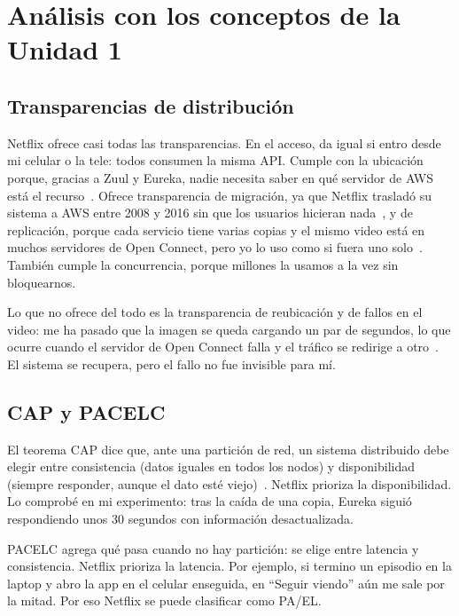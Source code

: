 \section{Análisis con los conceptos de la Unidad 1}

\subsection{Transparencias de distribución}

Netflix ofrece casi todas las transparencias. En el acceso, da igual si entro desde mi celular o la tele: todos consumen la misma API. Cumple con la ubicación porque, gracias a Zuul y Eureka, nadie necesita saber en qué servidor de AWS está el recurso~\cite{SpringCloudNetflix}. Ofrece transparencia de migración, ya que Netflix trasladó su sistema a AWS entre 2008 y 2016 sin que los usuarios hicieran nada~\cite{Netflix_CloudMigration}, y de replicación, porque cada servicio tiene varias copias y el mismo video está en muchos servidores de Open Connect, pero yo lo uso como si fuera uno solo~\cite{Netflix_OpenConnect}. También cumple la concurrencia, porque millones la usamos a la vez sin bloquearnos.

Lo que no ofrece del todo es la transparencia de reubicación y de fallos en el video: me ha pasado que la imagen se queda cargando un par de segundos, lo que ocurre cuando el servidor de Open Connect falla y el tráfico se redirige a otro~\cite{Netflix_OpenConnect}. El sistema se recupera, pero el fallo no fue invisible para mí.

\subsection{CAP y PACELC}

El teorema CAP dice que, ante una partición de red, un sistema distribuido debe elegir entre consistencia (datos iguales en todos los nodos) y disponibilidad (siempre responder, aunque el dato esté viejo)~\cite{vanSteen_2023}. Netflix prioriza la disponibilidad. Lo comprobé en mi experimento: tras la caída de una copia, Eureka siguió respondiendo unos 30 segundos con información desactualizada.

PACELC agrega qué pasa cuando no hay partición: se elige entre latencia y consistencia. Netflix prioriza la latencia. Por ejemplo, si termino un episodio en la laptop y abro la app en el celular enseguida, en \enquote{Seguir viendo} aún me sale por la mitad. Por eso Netflix se puede clasificar como PA/EL.

